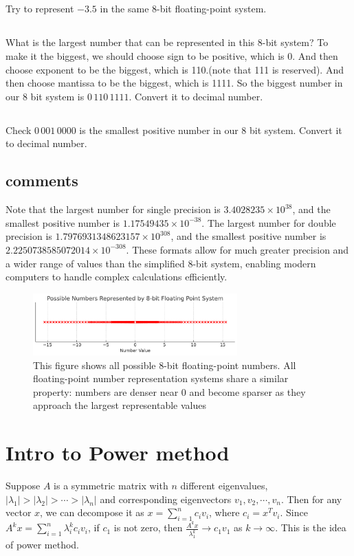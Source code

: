 \documentclass{article}%
\begin{document}
\subsection{}
Try to represent \(-3.5\) in the same 8-bit floating-point system.

\subsection{}
What is the largest number that can be represented in this 8-bit system? To make it the biggest, we should choose sign to be positive, which is 0. And then choose exponent to be the biggest, which is 110.(note that 111 is reserved). And then choose mantissa to be the biggest, which is 1111. So the biggest number in our 8 bit system is \(0 \, 110 \, 1111\). Convert it to decimal number. 

\subsection{}
Check \(0\,001\,0000\) is the smallest positive number in our 8 bit system. Convert it to decimal number.

\subsection{comments}
Note that the largest number for single precision is \(3.4028235 \times 10^{38}\), and the smallest positive number is \(1.17549435 \times 10^{-38}\). The largest number for double precision is \(1.7976931348623157 \times 10^{308}\), and the smallest positive number is \(2.2250738585072014 \times 10^{-308}\). These formats allow for much greater precision and a wider range of values than the simplified 8-bit system, enabling modern computers to handle complex calculations efficiently.

\begin{figure}[H] 
\centering 
\includegraphics[width=0.7\textwidth]{./output.png}
\caption{This figure shows all possible 8-bit floating-point numbers. All floating-point number representation systems share a similar property: numbers are denser near 0 and become sparser as they approach the largest representable values}
\end{figure}


\section{Intro to Power method}
Suppose \( A \) is a symmetric matrix with $n$ different eigenvalues, $|\lambda_1|>|\lambda_2|>\cdots>|\lambda_n|$ and corresponding eigenvectors $v_1,v_2,\cdots,v_n$. Then for any vector $x$, we can decompose it as $x=\sum_{i=1}^n c_i v_i$, where $c_i=x^Tv_i$. Since $A^kx=\sum_{i=1}^n\lambda_i^k c_i v_i$, if $c_1$ is not zero, then $\frac{A^kx}{\lambda_1^k}\to c_1v_1$ as $k\to\infty$. This is the idea of power method.

    
\end{document}
